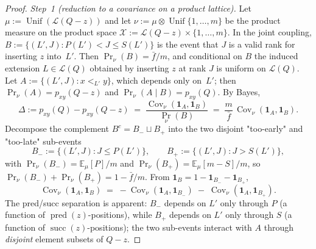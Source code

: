\begin{proof}
\emph{Step~1 (reduction to a covariance on a product lattice).}
Let $\mu := \operatorname{Unif}(\mathcal L(Q-z))$ and let
$\nu := \mu \otimes \operatorname{Unif}\{1, \ldots, m\}$ be the
product measure on the product space
$\mathcal X := \mathcal L(Q-z) \times \{1, \ldots, m\}$. In the joint
coupling, $B := \{(L', J) : P(L') < J \le S(L')\}$ is the event that
$J$ is a valid rank for inserting $z$ into~$L'$. Then
$\Pr_\nu(B) = \bar f/m$, and conditional on $B$ the induced extension
$L \in \mathcal L(Q)$ obtained by inserting $z$ at rank $J$ is uniform
on $\mathcal L(Q)$. Let $A := \{(L', J) : x <_{L'} y\}$, which depends
only on~$L'$; then $\Pr_\nu(A) = p_{xy}(Q-z)$ and
$\Pr_\nu(A \mid B) = p_{xy}(Q)$. By Bayes,
\begin{equation}\label{eq:delta-as-cov}
  \Delta := p_{xy}(Q) - p_{xy}(Q-z)
  \;=\; \frac{\operatorname{Cov}_\nu(\mathbf{1}_A, \mathbf{1}_B)}{\Pr_\nu(B)}
  \;=\; \frac{m}{\bar f}\,\operatorname{Cov}_\nu(\mathbf{1}_A, \mathbf{1}_B).
\end{equation}
Decompose the complement $B^c = B_- \sqcup B_+$ into the two disjoint
"too-early" and "too-late" sub-events
\begin{equation}\label{eq:Bbar-decomp}
  B_- := \{(L', J) : J \le P(L')\},
  \qquad
  B_+ := \{(L', J) : J > S(L')\},
\end{equation}
with
$\Pr_\nu(B_-) = \mathbb E_\mu[P]/m$ and
$\Pr_\nu(B_+) = \mathbb E_\mu[m - S]/m$, so
$\Pr_\nu(B_-) + \Pr_\nu(B_+) = 1 - \bar f/m$.
From $\mathbf{1}_B = 1 - \mathbf{1}_{B_-} - \mathbf{1}_{B_+}$,
\begin{equation}\label{eq:cov-split}
  \operatorname{Cov}_\nu(\mathbf{1}_A, \mathbf{1}_B)
  \;=\; -\operatorname{Cov}_\nu(\mathbf{1}_A, \mathbf{1}_{B_-})
  \;-\; \operatorname{Cov}_\nu(\mathbf{1}_A, \mathbf{1}_{B_+}).
\end{equation}
The pred/succ separation is apparent: $B_-$ depends on $L'$ only
through $P$ (a function of $\operatorname{pred}(z)$-positions), while
$B_+$ depends on $L'$ only through $S$ (a function of
$\operatorname{succ}(z)$-positions); the two sub-events interact with
$A$ through \emph{disjoint} element subsets of $Q-z$.


\end{proof}
